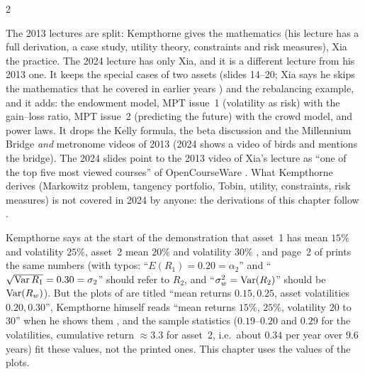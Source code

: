 \begin{paracol}{2}
\begin{coursenote}[2013 versus 2024]
The 2013 lectures are split: Kempthorne gives the mathematics (his lecture has a full derivation, a case study,
utility theory, constraints and risk measures), Xia the practice. The 2024 lecture has only Xia, and it is a
different lecture from his 2013 one. It keeps the special cases of two assets (slides 14--20; Xia says he skips the mathematics that he covered in earlier years ) and the rebalancing example, and it adds: the endowment model, MPT
issue~1 (volatility as risk) with the gain--loss ratio, MPT issue~2 (predicting the future) with the crowd model, and
power laws. It drops the Kelly formula, the beta discussion and the Millennium Bridge \emph{and} metronome videos of 2013 (2024 shows
a video of birds and mentions the bridge). The 2024 slides point to the 2013 video of Xia's lecture as
``one of the top five most viewed courses'' of OpenCourseWare . What Kempthorne derives (Markowitz problem, tangency
portfolio, Tobin, utility, constraints, risk measures) is not covered in 2024 by anyone: the derivations of this chapter
follow .
\end{coursenote}

\begin{coursenote}
Kempthorne says at the start of the demonstration that asset~1 has mean $15\%$ and volatility $25\%$, asset~2 mean $20\%$ and
volatility $30\%$ , and page~2 of  prints the same numbers (with typos:
``$E(R_1)=0.20=\alpha_2$'' and ``$\sqrt{\operatorname{Var} R_1}=0.30=\sigma_2$'' should refer to $R_2$, and ``$\sigma_w^2=\operatorname{Var}(R_2)$'' should be
$\operatorname{Var}(R_w)$). But the plots of  are titled ``mean returns $0.15,0.25$, asset volatilities $0.20,0.30$'',
Kempthorne himself reads ``mean returns $15\%$, $25\%$, volatility $20$ to $30$'' when he shows them , and the
sample statistics ($0.19$--$0.20$ and $0.29$ for the volatilities, cumulative return $\approx3.3$ for asset~2, i.e.\ about $0.34$ per year over $9.6$ years) fit
these values, not the printed ones. This chapter uses the values of the plots.
\end{coursenote}


\end{paracol}
